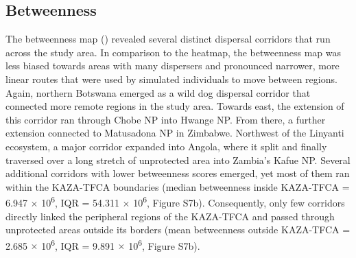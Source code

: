 \documentclass[abstract=on,10pt,a4paper,bibliography=totocnumbered]{article}
\begin{document}
\subsection{Betweenness}
The betweenness map () revealed several distinct dispersal
corridors that run across the study area. In comparison to the heatmap, the
betweenness map was less biased towards areas with many dispersers and
pronounced narrower, more linear routes that were used by simulated individuals
to move between regions. Again, northern Botswana emerged as a wild dog
dispersal corridor that connected more remote regions in the study area. Towards
east, the extension of this corridor ran through Chobe NP into Hwange NP. From
there, a further extension connected to Matusadona NP in Zimbabwe. Northwest of
the Linyanti ecosystem, a major corridor expanded into Angola, where it split
and finally traversed over a long stretch of unprotected area into Zambia's
Kafue NP. Several additional corridors with lower betweenness scores emerged,
yet most of them ran within the KAZA-TFCA boundaries (median betweenness inside
KAZA-TFCA = 6.947 \(\times\) 10\textsuperscript{6}, IQR = 54.311 \(\times\)
10\textsuperscript{6}, Figure S7b). Consequently, only few corridors directly
linked the peripheral regions of the KAZA-TFCA and passed through unprotected
areas outside its borders (mean betweenness outside KAZA-TFCA = 2.685 \(\times\)
10\textsuperscript{6}, IQR = 9.891 \(\times\) 10\textsuperscript{6}, Figure
S7b).

\end{document}
